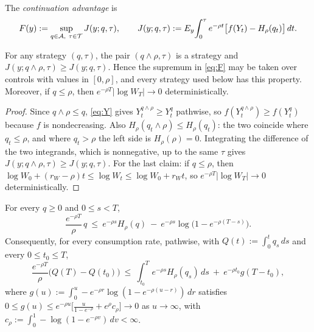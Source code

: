 The \emph{continuation advantage} is
\begin{equation}
F(y):=\sup_{q\in\mathcal{A},\ \tau\in\mathcal{T}} J(y;q,\tau),\qquad J(y;q,\tau):=E_y\!\int_0^\tau e^{-\rho t}\big[f(Y_t)-H_\rho(q_t)\big]\,dt . \label{eq:F}
\end{equation}

\begin{alemma}\label{lem:trunc}
For any strategy $(q,\tau)$, the pair $(q\wedge\rho,\tau)$ is a strategy and $J(y;q\wedge\rho,\tau)\ge J(y;q,\tau)$. Hence the supremum in \eqref{eq:F} may be taken over controls with values in $[0,\rho]$, and every strategy used below has this property. Moreover, if $q\le\rho$, then $e^{-\rho T}|\log W_T|\to0$ deterministically.
\end{alemma}

\begin{proof}
Since $q\wedge\rho\le q$, \eqref{eq:Y} gives $Y^{q\wedge\rho}_t\ge Y^q_t$ pathwise, so $f(Y^{q\wedge\rho}_t)\ge f(Y^q_t)$ because $f$ is nondecreasing. Also $H_\rho(q_t\wedge\rho)\le H_\rho(q_t)$: the two coincide where $q_t\le\rho$, and where $q_t>\rho$ the left side is $H_\rho(\rho)=0$. Integrating the difference of the two integrands, which is nonnegative, up to the same $\tau$ gives $J(y;q\wedge\rho,\tau)\ge J(y;q,\tau)$. For the last claim: if $q\le\rho$, then $\log W_0+(r_W-\rho)t\le\log W_t\le\log W_0+r_Wt$, so $e^{-\rho T}|\log W_T|\to0$ deterministically.
\end{proof}

\begin{alemma}\label{lem:burst}
For every $q\ge0$ and $0\le s<T$,
\begin{equation}
\frac{e^{-\rho T}}{\rho}\,q\ \le\ e^{-\rho s}H_\rho(q)\ -\ e^{-\rho s}\log\!\big(1-e^{-\rho(T-s)}\big). \label{eq:legendre}
\end{equation}
Consequently, for every consumption rate, pathwise, with $Q(t):=\int_0^t q_s\,ds$ and every $0\le t_0\le T$,
\begin{equation}
\frac{e^{-\rho T}}{\rho}\big(Q(T)-Q(t_0)\big)\ \le\ \int_{t_0}^T e^{-\rho s}H_\rho(q_s)\,ds\ +\ e^{-\rho t_0}g(T-t_0), \label{eq:burst}
\end{equation}
where $g(u):=\int_0^u -e^{-\rho r}\log(1-e^{-\rho(u-r)})\,dr$ satisfies $0\le g(u)\le e^{-\rho u}\big[\frac{u}{1-e^{-\rho}}+e^{\rho}c_\rho\big]\to0$ as $u\to\infty$, with $c_\rho:=\int_0^1-\log(1-e^{-\rho v})\,dv<\infty$.
\end{alemma}

